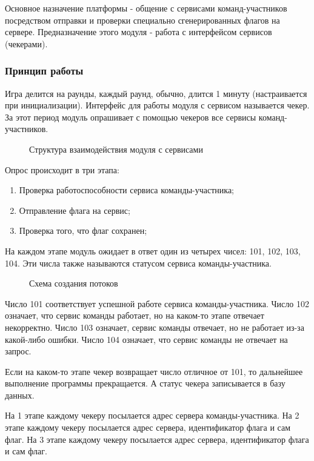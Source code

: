Основное назначение платформы - общение с сервисами команд-участников посредством отправки и проверки специально сгенерированных флагов на сервере. Предназначение этого модуля - работа с интерфейсом сервисов (чекерами).

\subsubsection{Принцип работы}
Игра делится на раунды, каждый раунд, обычно, длится 1 минуту (настраивается при инициализации). Интерфейс для работы модуля с сервисом называется чекер. За этот период модуль опрашивает с помощью чекеров все сервисы команд-участников.

\begin{figure}[ht!]
\caption{Структура взаимодействия модуля с сервисами}
\end{figure}

Опрос происходит в три этапа:
\begin{enumerate} 
\item Проверка работоспособности сервиса команды-участника;
\item Отправление флага на сервис; 
\item Проверка того, что флаг сохранен;
\end{enumerate}

На каждом этапе модуль ожидает в ответ один из четырех чисел: 101, 102, 103, 104. Эти числа также называются статусом сервиса команды-участника.

\begin{figure}[ht!]
\caption{Схема создания потоков}
\end{figure}
\clearpage

Число 101 соответствует успешной работе сервиса команды-участника. Число 102 означает, что сервис команды работает, но на каком-то этапе отвечает некорректно. Число 103 означает, сервис команды отвечает, но не работает из-за какой-либо ошибки. Число 104 означает, что сервис команды не отвечает на запрос. 

Если на каком-то этапе чекер возвращает число отличное от 101, то дальнейшее выполнение программы прекращается. А статус чекера записывается в базу данных.

На 1 этапе каждому чекеру посылается адрес сервера команды-участника. 
На 2 этапе каждому чекеру посылается адрес сервера, идентификатор флага и сам флаг. 
На 3 этапе каждому чекеру посылается адрес сервера, идентификатор флага и сам флаг.

